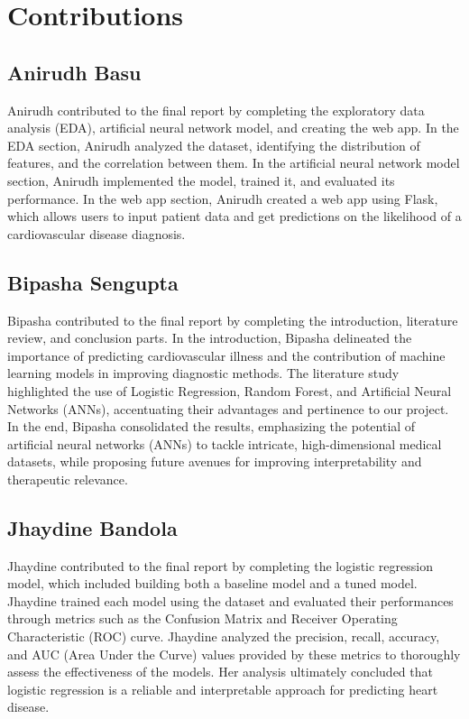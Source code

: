\section{Contributions}

\subsection{Anirudh Basu}
Anirudh contributed to the final report by completing the exploratory data analysis (EDA), artificial neural network model, and creating the web app. In the EDA section, Anirudh analyzed the dataset, identifying the distribution of features, and the correlation between them. In the artificial neural network model section, Anirudh implemented the model, trained it, and evaluated its performance. In the web app section, Anirudh created a web app using Flask, which allows users to input patient data and get predictions on the likelihood of a cardiovascular disease diagnosis.

\subsection{Bipasha Sengupta}
Bipasha contributed to the final report by completing the introduction, literature review, and conclusion parts. In the introduction, Bipasha delineated the importance of predicting cardiovascular illness and the contribution of machine learning models in improving diagnostic methods. The literature study highlighted the use of Logistic Regression, Random Forest, and Artificial Neural Networks (ANNs), accentuating their advantages and pertinence to our project. In the end, Bipasha consolidated the results, emphasizing the potential of artificial neural networks (ANNs) to tackle intricate, high-dimensional medical datasets, while proposing future avenues for improving interpretability and therapeutic relevance.

\subsection{Jhaydine Bandola}
Jhaydine contributed to the final report by completing the logistic regression model, which included building both a baseline model and a tuned model. Jhaydine trained each model using the dataset and evaluated their performances through metrics such as the Confusion Matrix and Receiver Operating Characteristic (ROC) curve. Jhaydine analyzed the precision, recall, accuracy, and AUC (Area Under the Curve) values provided by these metrics to thoroughly assess the effectiveness of the models. Her analysis ultimately concluded that logistic regression is a reliable and interpretable approach for predicting heart disease.

